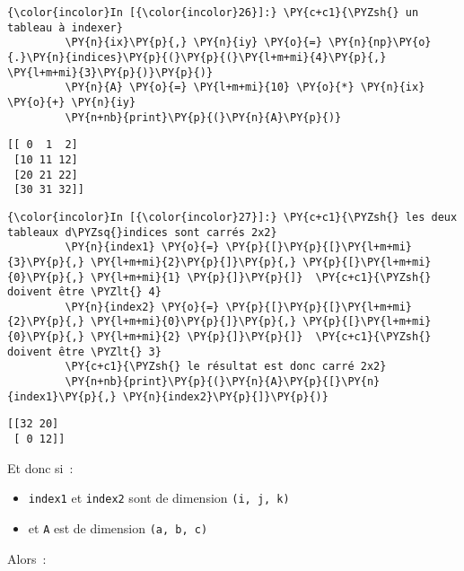     \begin{Verbatim}[commandchars=\\\{\}]
{\color{incolor}In [{\color{incolor}26}]:} \PY{c+c1}{\PYZsh{} un tableau à indexer}
         \PY{n}{ix}\PY{p}{,} \PY{n}{iy} \PY{o}{=} \PY{n}{np}\PY{o}{.}\PY{n}{indices}\PY{p}{(}\PY{p}{(}\PY{l+m+mi}{4}\PY{p}{,} \PY{l+m+mi}{3}\PY{p}{)}\PY{p}{)}
         \PY{n}{A} \PY{o}{=} \PY{l+m+mi}{10} \PY{o}{*} \PY{n}{ix} \PY{o}{+} \PY{n}{iy}
         \PY{n+nb}{print}\PY{p}{(}\PY{n}{A}\PY{p}{)}
\end{Verbatim}


    \begin{Verbatim}[commandchars=\\\{\}]
[[ 0  1  2]
 [10 11 12]
 [20 21 22]
 [30 31 32]]

    \end{Verbatim}

    \begin{Verbatim}[commandchars=\\\{\}]
{\color{incolor}In [{\color{incolor}27}]:} \PY{c+c1}{\PYZsh{} les deux tableaux d\PYZsq{}indices sont carrés 2x2}
         \PY{n}{index1} \PY{o}{=} \PY{p}{[}\PY{p}{[}\PY{l+m+mi}{3}\PY{p}{,} \PY{l+m+mi}{2}\PY{p}{]}\PY{p}{,} \PY{p}{[}\PY{l+m+mi}{0}\PY{p}{,} \PY{l+m+mi}{1} \PY{p}{]}\PY{p}{]}  \PY{c+c1}{\PYZsh{} doivent être \PYZlt{} 4}
         \PY{n}{index2} \PY{o}{=} \PY{p}{[}\PY{p}{[}\PY{l+m+mi}{2}\PY{p}{,} \PY{l+m+mi}{0}\PY{p}{]}\PY{p}{,} \PY{p}{[}\PY{l+m+mi}{0}\PY{p}{,} \PY{l+m+mi}{2} \PY{p}{]}\PY{p}{]}  \PY{c+c1}{\PYZsh{} doivent être \PYZlt{} 3}
         \PY{c+c1}{\PYZsh{} le résultat est donc carré 2x2}
         \PY{n+nb}{print}\PY{p}{(}\PY{n}{A}\PY{p}{[}\PY{n}{index1}\PY{p}{,} \PY{n}{index2}\PY{p}{]}\PY{p}{)}
\end{Verbatim}


    \begin{Verbatim}[commandchars=\\\{\}]
[[32 20]
 [ 0 12]]

    \end{Verbatim}

    Et donc si~:

\begin{itemize}
\tightlist
\item
  \texttt{index1} et \texttt{index2} sont de dimension
  \texttt{(i,\ j,\ k)}
\item
  et \texttt{A} est de dimension \texttt{(a,\ b,\ c)}
\end{itemize}

Alors~:

